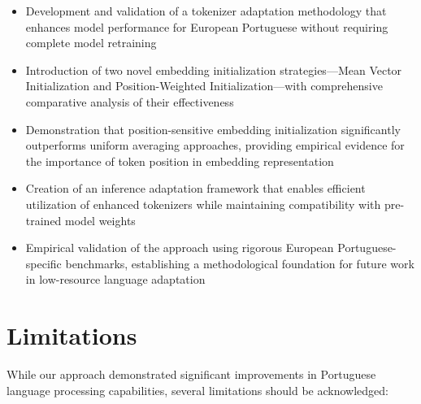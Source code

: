 \begin{itemize}
    \item Development and validation of a tokenizer adaptation methodology that enhances model performance for European Portuguese without requiring complete model retraining
    
    \item Introduction of two novel embedding initialization strategies—Mean Vector Initialization and Position-Weighted Initialization—with comprehensive comparative analysis of their effectiveness
    
    \item Demonstration that position-sensitive embedding initialization significantly outperforms uniform averaging approaches, providing empirical evidence for the importance of token position in embedding representation
    
    \item Creation of an inference adaptation framework that enables efficient utilization of enhanced tokenizers while maintaining compatibility with pre-trained model weights
    
    \item Empirical validation of the approach using rigorous European Portuguese-specific benchmarks, establishing a methodological foundation for future work in low-resource language adaptation
\end{itemize}

\section{Limitations}
While our approach demonstrated significant improvements in Portuguese language processing capabilities, several limitations should be acknowledged:

